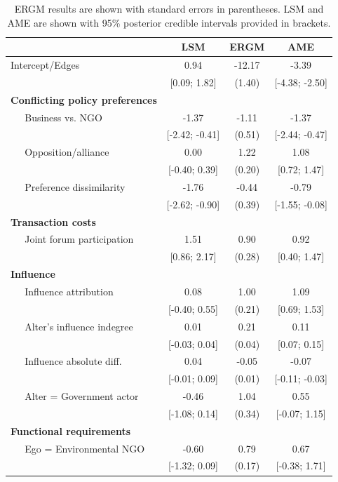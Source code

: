 \begin{table}[ht]
\centering
\caption{ERGM results are shown with standard errors in parentheses. LSM and AME are shown with 95\% posterior credible intervals provided in brackets.}
\begin{tabular}{lccc}
  & LSM & ERGM & AME \\
  \hline
\hline
Intercept/Edges & 0.94 & -12.17 & -3.39 \\
   & [0.09; 1.82] & (1.40) & [-4.38; -2.50] \\
  \textbf{Conflicting policy preferences}  &  &  &  \\
  $\;\;\;\;$ Business vs. NGO & -1.37 & -1.11 & -1.37 \\
   & [-2.42; -0.41] & (0.51) & [-2.44; -0.47] \\
  $\;\;\;\;$ Opposition/alliance  & 0.00 & 1.22 & 1.08 \\
   & [-0.40; 0.39] & (0.20) & [0.72; 1.47] \\
  $\;\;\;\;$ Preference dissimilarity & -1.76 & -0.44 & -0.79 \\
   & [-2.62; -0.90] & (0.39) & [-1.55; -0.08] \\
  \textbf{Transaction costs}  &  &  &  \\
  $\;\;\;\;$ Joint forum participation & 1.51 & 0.90 & 0.92 \\
   & [0.86; 2.17] & (0.28) & [0.40; 1.47] \\
  \textbf{Influence}  &  &  &  \\
  $\;\;\;\;$ Influence attribution & 0.08 & 1.00 & 1.09 \\
   & [-0.40; 0.55] & (0.21) & [0.69; 1.53] \\
  $\;\;\;\;$ Alter's influence indegree & 0.01 & 0.21 & 0.11 \\
   & [-0.03; 0.04] & (0.04) & [0.07; 0.15] \\
  $\;\;\;\;$ Influence absolute diff. & 0.04 & -0.05 & -0.07 \\
   & [-0.01; 0.09] & (0.01) & [-0.11; -0.03] \\
  $\;\;\;\;$ Alter = Government actor & -0.46 & 1.04 & 0.55 \\
   & [-1.08; 0.14] & (0.34) & [-0.07; 1.15] \\
  \textbf{Functional requirements}  &  &  &  \\
  $\;\;\;\;$ Ego = Environmental NGO & -0.60 & 0.79 & 0.67 \\
  & [-1.32; 0.09] & (0.17) & [-0.38; 1.71] \\

\end{tabular}
\end{table}
